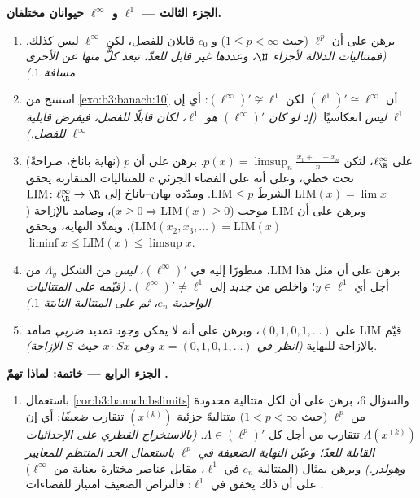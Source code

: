 \begin{problem}[{مسألة نهاية الأسبوع --- $(\ell^p)' = \ell^q$، والانعكاسية،
وغرابة $\ell^\infty$}]
\medskip
\noindent\textbf{الجزء الثالث --- $\ell^1$ و $\ell^\infty$
حيوانان مختلفان.}
\begin{enumerate}[resume]
  \item برهن على أن $\ell^p$ (حيث $1 \leq p < \infty$) و $c_0$ قابلان
        للفصل، لكن $\ell^\infty$ ليس كذلك. \emph{(فمتتاليات
        الدلالة لأجزاء $\N$، وعددها غير قابل للعدّ، تبعد كلٌّ منها
        عن الأخرى مسافة $1$.)}
  \item استنتج من \cref{exo:b3:banach:10} أن $(\ell^1)'
        \cong \ell^\infty$ لكن $(\ell^\infty)' \not\cong
        \ell^1$: أي إن
        $\ell^1$ \emph{ليس} انعكاسيًا. \emph{(إذ لو كان
        $(\ell^\infty)'$ هو $\ell^1$، لكان قابلًا للفصل، فيفرض
        قابلية $\ell^\infty$ للفصل.)}
  \item (نهاية باناخ، صراحةً) على $\ell^\infty_\R$، لتكن
        $p(x) = \limsup_n \frac{x_1 + \dots + x_n}{n}$. برهن على أن $p$ تحت خطي، وعلى أنه على الفضاء
        الجزئي $c$ للمتتاليات المتقاربة يحقق $\mathrm{LIM}(x) = \lim x$ الشرطَ
        $\mathrm{LIM} \leq p$. ومدّده بهان--باناخ إلى $\mathrm{LIM} \colon \ell^\infty_\R \to \R$ وبرهن على أن
        $\mathrm{LIM}$ موجب ($x \geq 0 \Rightarrow
        \mathrm{LIM}(x) \geq 0$)، وصامد بالإزاحة ($\mathrm{LIM}(x_2, x_3, \dots) = \mathrm{LIM}(x)$)،
        ويمدّد النهاية، ويحقق $\liminf x \leq
        \mathrm{LIM}(x)\leq \limsup x$.
  \item برهن على أن مثل هذا $\mathrm{LIM}$، منظورًا إليه في
        $(\ell^\infty)'$، \emph{ليس} من الشكل $\Lambda_y$ من
        أجل أي $y \in \ell^1$؛ واخلص من جديد إلى $(\ell^\infty)'
        \neq \ell^1$.
        \emph{(قيّمه على المتتاليات الواحدية $e_n$، ثم على
        المتتالية الثابتة $1$.)}
  \item قيّم $\mathrm{LIM}$ على $(0,1,0,1,\dots)$، وبرهن على أنه لا يمكن
        وجود تمديد \emph{ضربي} صامد بالإزاحة للنهاية \emph{(انظر
        في $x =
        (0,1,0,1,\dots)$ وفي $x\cdot Sx$ حيث $S$ الإزاحة)}.
\end{enumerate}

\medskip
\noindent\textbf{الجزء الرابع --- خاتمة: لماذا تهمّ
.}
\begin{enumerate}[resume]
  \item باستعمال \cref{cor:b3:banach:bslimits} والسؤال 6، برهن على أن لكل متتالية
        محدودة من $\ell^p$ (حيث $1 < p <
        \infty$) متتاليةً جزئية
        $(x^{(k)})$ تتقارب \emph{ضعيفًا}: أي إن $\Lambda(x^{(k)})$ تتقارب
        من أجل كل $\Lambda \in (\ell^p)'$. \emph{(بالاستخراج القطري على
        الإحداثيات القابلة للعدّ؛ وعيّن النهاية الضعيفة في $\ell^p$
        باستعمال الحد المنتظم للمعايير وهولدر.)} وبرهن بمثال
        (المتتالية $e_n$ في $\ell^1$، مقابل عناصر مختارة بعناية
        من $\ell^\infty$) على أن ذلك يخفق في $\ell^1$: فالتراص
        الضعيف امتياز للفضاءات .
\end{enumerate}


\end{problem}

